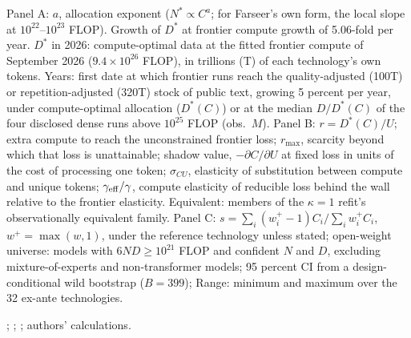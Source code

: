 \begin{table}[tp]
\begin{tabular*}{\textwidth}{@{\extracolsep{\fill}}lccccccc@{}}
\bottomrule
\end{tabular*}
\vspace{2pt}
\begin{tablenotes}[Notes]
Panel A: $a$, allocation exponent ($N^*\propto C^{a}$; for Farseer's own form, the local slope at $10^{22}$--$10^{23}$
FLOP). Growth of $D^*$ at frontier compute growth of 5.06-fold per year. $D^*$ in 2026: compute-optimal data at the
fitted frontier compute of September 2026 ($9.4\times10^{26}$ FLOP), in trillions (T) of each technology's own tokens.
Years: first date at which frontier runs reach the quality-adjusted (100T) or repetition-adjusted (320T) stock of public
text, growing 5 percent per year, under compute-optimal allocation ($D^*(C)$) or at the median $D/D^*(C)$ of the four
disclosed dense runs above $10^{25}$ FLOP (obs.\ $M$). Panel B: $r=D^*(C)/U$; extra compute to reach the unconstrained
frontier loss; $r_{\max}$, scarcity beyond which that loss is unattainable; shadow value, $-\partial C/\partial U$ at
fixed loss in units of the cost of processing one token; $\sigma_{CU}$, elasticity of substitution between compute and
unique tokens; $\gamma_{\rm eff}/\gamma$, compute elasticity of reducible loss behind the wall relative to the frontier
elasticity. Equivalent: members of the $\kappa=1$ refit's observationally equivalent family. Panel C:
$s=\sum_i(w_i^+-1)C_i/\sum_iw_i^+C_i$, $w^+=\max(w,1)$, under the reference technology unless stated; open-weight
universe: models with $6ND\geq10^{21}$ FLOP and confident $N$ and $D$, excluding mixture-of-experts and non-transformer
models; 95 percent CI from a design-conditional wild bootstrap ($B=399$); Range: minimum and maximum over the 32 ex-ante
technologies.
\end{tablenotes}
\begin{tablenotes}[Source]
\citet{epochai2026data}; \citet{villalobos2022run}; \citet{muennighoff2023scaling}; authors' calculations.
\end{tablenotes}
\end{table}
